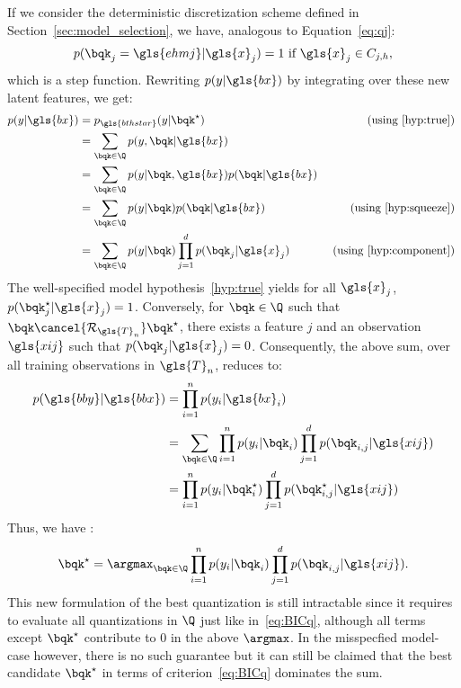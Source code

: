 If we consider the deterministic discretization scheme defined in Section~\ref{sec:model_selection}, we have, analogous to Equation~\eqref{eq:qj}:
$$
p(\bqk_j = \gls{ehmj} | \gls{x}_j) = 1 \text{ if } \gls{x}_j \in C_{j,h},
$$
which is a step function. Rewriting $p(y| \gls{bx})$ by integrating over these new latent features,
we get:
\begin{align*}
p(y | \gls{bx}) & = p_{\gls{bthstar}}(y | \bqk^\star) & \text{ (using \eqref{hyp:true}) } \\
& = \sum_{\bqk \in \Q} p(y, \bqk | \gls{bx}) \\
& = \sum_{\bqk \in \Q} p(y | \bqk, \gls{bx}) p(\bqk | \gls{bx}) \\
& = \sum_{\bqk \in \Q} p(y | \bqk) p(\bqk | \gls{bx}) & \text{ (using \eqref{hyp:squeeze}) } \\
& = \sum_{\bqk \in \Q} p(y | \bqk) \prod_{j=1}^d p(\bqk_j | \gls{x}_j) & \text{ (using \eqref{hyp:component}) }
\end{align*}
The well-specified model hypothesis~\eqref{hyp:true} yields for all $\gls{x}_j$, $p(\bqk_j^\star | \gls{x}_j) = 1$. Conversely, for $\bqk \in \Q$ such that $\bqk \cancel{\mathcal{R}_{\gls{T}_n}} \bqk^\star$, there exists a feature $j$ and an observation $\gls{xij}$ such that $p(\bqk_j | \gls{x}_j) = 0$. Consequently, the above sum, over all training observations in $\gls{T}_n$, reduces to:
\begin{align*}
p(\gls{bby} | \gls{bbx}) & = \prod_{i=1}^n p(y_i | \gls{bx}_i) \\
 & = \sum_{\bqk \in \Q} \prod_{i=1}^n p(y_i | \bqk_i) \prod_{j=1}^d p(\bqk_{i,j} | \gls{xij}) \\
 & = \prod_{i=1}^n p(y_i | \bqk_i^\star) \prod_{j=1}^d p(\bqk_{i,j}^\star | \gls{xij})
\end{align*}
Thus, we have :
\[ \bqk^\star = \argmax_{\bqk \in \Q} \prod_{i=1}^n p(y_i | \bqk_i ) \prod_{j=1}^d p(\bqk_{i,j} | \gls{xij}). \]
This new formulation of the best quantization is still intractable since it requires to evaluate all quantizations in $\Q$ just like in~\eqref{eq:BICq}, although all terms except $\bqk^\star$ contribute to $0$ in the above $\argmax$. In the misspecfied model-case however, there is no such guarantee but it can still be claimed that the best candidate $\bqk^\star$ in terms of criterion~\eqref{eq:BICq} dominates the sum.

